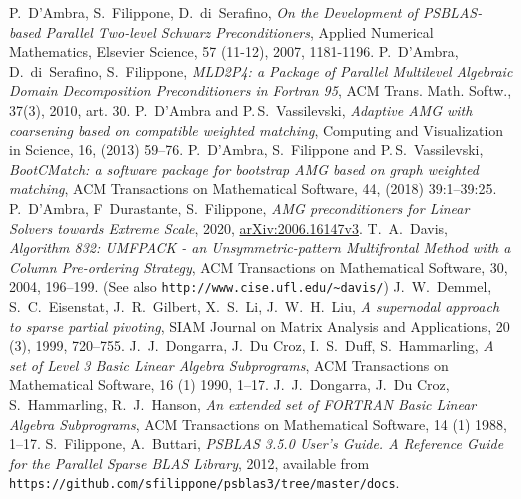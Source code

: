 \begin{thebibliography}{99}
%
P.~D'Ambra, S.~Filippone,  D.~di~Serafino,
{\em On the Development of PSBLAS-based Parallel Two-level Schwarz Preconditioners},
Applied Numerical Mathematics, Elsevier Science,
57 (11-12), 2007, 1181-1196.
%
P.~D'Ambra, D.~di~Serafino, S.~Filippone,
\emph{MLD2P4: a Package of Parallel Multilevel
Algebraic Domain Decomposition Preconditioners
in Fortran 95},  ACM Trans. Math. Softw., 37(3), 2010, art. 30.
%
P.~D'Ambra and P.\,S.~Vassilevski,
{\em Adaptive AMG with coarsening based on compatible weighted matching},
Computing and Visualization in Science, 16, (2013) 59--76.
%
P.~D'Ambra, S.~Filippone and P.\,S.~Vassilevski,
{\em BootCMatch: a software package for bootstrap AMG based on graph weighted matching},
ACM Transactions on Mathematical Software, 44, (2018) 39:1--39:25.
%
P.~D'Ambra, F~Durastante, S.~Filippone, 
\emph{AMG preconditioners for Linear Solvers towards Extreme Scale}, 2020, \href{https://arxiv.org/abs/2006.16147v3arXiv:2006.16147v2}{arXiv:2006.16147v3}.
%
T.~A.~Davis,
{\em Algorithm 832: UMFPACK - an Unsymmetric-pattern Multifrontal
Method with a Column Pre-ordering Strategy},
ACM Transactions on Mathematical Software, 30, 2004, 196--199.
(See also \texttt{http://www.cise.ufl.edu/{\textasciitilde}davis/})
%
J.~W.~Demmel, S.~C.~Eisenstat, J.~R.~Gilbert, X.~S.~Li, J.~W.~H.~Liu,
{\em A supernodal approach to sparse partial pivoting},
SIAM Journal on Matrix Analysis and Applications, 20 (3), 1999, 720--755.
%
J.~J.~Dongarra, J.~Du Croz, I.~S.~Duff, S.~Hammarling,
\emph{A set of Level 3 Basic Linear Algebra Subprograms},
ACM Transactions on Mathematical Software, 16 (1) 1990, 1--17.
%
J.~J.~Dongarra, J.~Du Croz, S.~Hammarling, R.~J.~Hanson,
\emph{An extended set of FORTRAN Basic Linear Algebra Subprograms},
ACM Transactions on Mathematical Software, 14 (1) 1988, 1--17.
%
%
%
S.~Filippone, A.~Buttari,
{\em PSBLAS 3.5.0 User's Guide. A Reference Guide for the Parallel Sparse BLAS Library}, 2012,
available from \texttt{https://github.com/sfilippone/psblas3/tree/master/docs}.

\end{thebibliography}
